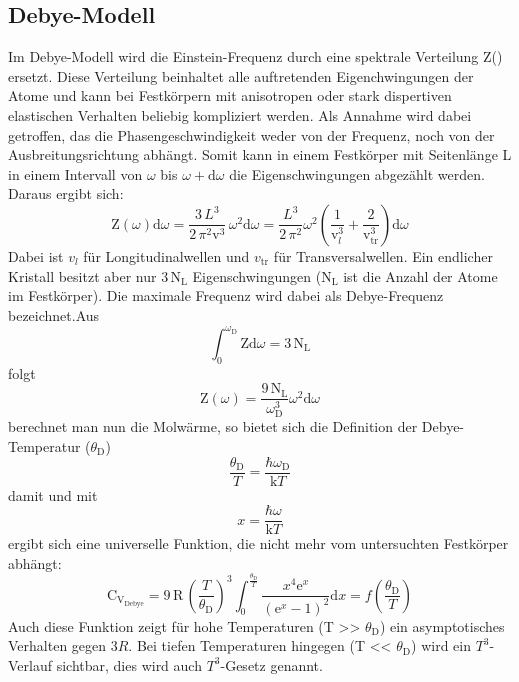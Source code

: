 \subsection{Debye-Modell}
\label{sec:Debye-Modell}
Im Debye-Modell wird die Einstein-Frequenz durch eine spektrale Verteilung Z(\omega)
ersetzt. Diese Verteilung beinhaltet alle auftretenden Eigenchwingungen der Atome
und kann bei Festkörpern mit anisotropen oder stark dispertiven elastischen Verhalten
beliebig kompliziert werden. Als Annahme wird dabei getroffen, das die Phasengeschwindigkeit
weder von der Frequenz, noch von der Ausbreitungsrichtung abhängt. Somit kann in
einem Festkörper mit Seitenlänge L in einem Intervall von $\omega$ bis $\omega + \text{d}\omega$
die Eigenschwingungen abgezählt werden. Daraus ergibt sich:
\begin{equation}
  \text{Z}(\omega) \text{d}\omega = \frac{3\,L^3}{2\,\pi^2\text{v}^3}\,\omega^2 \text{d}\omega = \frac{L^3}{2\,\pi^2}\omega^2\left(\frac{1}{\text{v}_l^3}+\frac{2}{\text{v}_\text{tr}^3}\right)\text{d}\omega
\end{equation}
Dabei ist $v_l$ für Longitudinalwellen und $v_\text{tr}$ für Transversalwellen. Ein endlicher Kristall besitzt aber nur $3\,\text{N}_\text{L}$ Eigenschwingungen ($\text{N}_\text{L}$
ist die Anzahl der Atome im Festkörper). Die maximale Frequenz wird dabei als Debye-Frequenz bezeichnet.Aus
\begin{equation}
  \int_0^{\omega_\text{D}} \text{Z} \text{d}\omega = 3\,\text{N}_\text{L}
\end{equation}
folgt
\begin{equation}
  \text{Z}(\omega) = \frac{9\,\text{N}_\text{L}}{\omega_\text{D}^3}\omega^2 \text{d}\omega
\end{equation}
berechnet man nun die Molwärme, so bietet sich die Definition der Debye-Temperatur ($\theta_\text{D}$)
\begin{equation}
  \frac{\theta_\text{D}}{T} = \frac{\hbar\omega_\text{D}}{\text{k}T}
\end{equation}
damit und mit
\begin{equation}
  x = \frac{\hbar\omega}{\text{k}T}
\end{equation}
ergibt sich eine universelle Funktion, die nicht mehr vom untersuchten Festkörper abhängt:
\begin{equation}
  \text{C}_{\text{V}_\text{Debye}} = 9\,\text{R}\,\left(\frac{T}{\theta_\text{D}}\right)^3 \int_0^{\frac{\theta_\text{D}}{T}} \frac{x^4\text{e}^x}{\left(\text{e}^x - 1\right)^2}\text{d}x = f\left(\frac{\theta_\text{D}}{T}\right)
\end{equation}
Auch diese Funktion zeigt für hohe Temperaturen (T >> $\theta_\text{D}$) ein asymptotisches Verhalten gegen 3$R$. Bei tiefen Temperaturen hingegen (T << $\theta_\text{D}$) wird ein
$T^3$-Verlauf sichtbar, dies wird auch $T^3$-Gesetz genannt.

